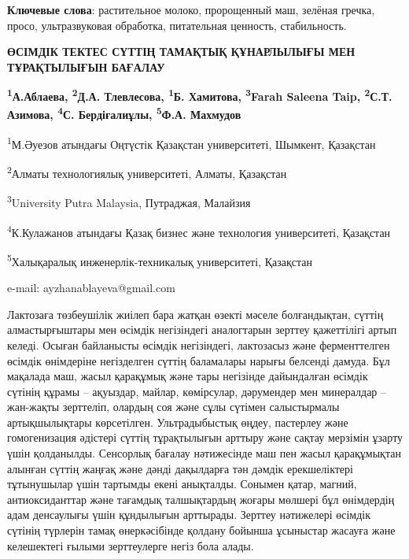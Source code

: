 {\bfseries Ключевые слова}: растительное молоко, пророщенный маш, зелёная
гречка, просо, ультразвуковая обработка, питательная ценность,
стабильность.

\begin{articleheader}
{\bfseries ӨСІМДІК ТЕКТЕС СҮТТІҢ ТАМАҚТЫҚ ҚҰНАРЛЫЛЫҒЫ МЕН ТҰРАҚТЫЛЫҒЫН БАҒАЛАУ}

{\bfseries
\textsuperscript{1}А.Аблаева\textsuperscript{\envelope },
\textsuperscript{2}Д.А. Тлевлесова,
\textsuperscript{1}Б. Хамитова,
\textsuperscript{3}Farah Saleena Taip,
\textsuperscript{2}С.Т. Азимова,
\textsuperscript{4}С. Бердіғалиұлы,
\textsuperscript{5}Ф.А. Махмудов
}
\end{articleheader}

\begin{affiliation}
\textsuperscript{1}М.Әуезов атындағы Оңтүстік Қазақстан университеті, Шымкент, Қазақстан

\textsuperscript{2}Алматы технологиялық университеті, Алматы, Қазақстан

\textsuperscript{3}University Putra Malaysia, Путраджая, Малайзия

\textsuperscript{4}К.Кулажанов атындағы Қазақ бизнес және технология университеті, Қазақстан

\textsuperscript{5}Халықаралық инженерлік-техникалық университеті, Қазақстан

e-mail: ayzhanablayeva@gmail.com
\end{affiliation}

Лактозаға төзбеушілік жиілеп бара жатқан өзекті мәселе болғандықтан,
сүттің алмастырғыштары мен өсімдік негізіндегі аналогтарын зерттеу
қажеттілігі артып келеді. Осыған байланысты өсімдік негізіндегі,
лактозасыз және ферменттелген өсімдік өнімдеріне негізделген сүттің
баламалары нарығы белсенді дамуда. Бұл мақалада маш, жасыл қарақұмық
және тары негізінде дайындалған өсімдік сүтінің құрамы -- ақуыздар,
майлар, көмірсулар, дәрумендер мен минералдар -- жан-жақты зерттеліп,
олардың соя және сұлы сүтімен салыстырмалы артықшылықтары көрсетілген.
Ультрадыбыстық өңдеу, пастерлеу және гомогенизация әдістері сүттің
тұрақтылығын арттыру және сақтау мерзімін ұзарту үшін қолданылды.
Сенсорлық бағалау нәтижесінде маш пен жасыл қарақұмықтан алынған сүттің
жаңғақ және дәнді дақылдарға тән дәмдік ерекшеліктері тұтынушылар үшін
тартымды екені анықталды. Сонымен қатар, магний, антиоксиданттар және
тағамдық талшықтардың жоғары мөлшері бұл өнімдердің адам денсаулығы үшін
құндылығын арттырады. Зерттеу нәтижелері өсімдік сүтінің түрлерін тамақ
өнеркәсібінде қолдану бойынша ұсыныстар жасауға және келешектегі ғылыми
зерттеулерге негіз бола алады.

